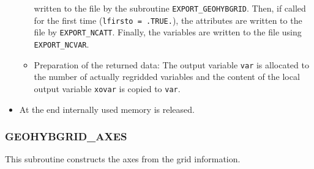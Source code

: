 \documentclass[11pt,twoside]{article}
\begin{document}
\begin{itemize}
\begin{itemize}
written to the file by the
subroutine \verb|EXPORT_GEOHYBGRID|. Then, if called for the first
time (\verb|lfirsto = .TRUE.|), the attributes are written to the
file by \verb|EXPORT_NCATT|. Finally, the variables are written to the file
using \verb|EXPORT_NCVAR|. 
\item Preparation of the returned data: The output variable \verb|var|
is allocated to the number of actually regridded variables and the
content of the local output variable \verb|xovar| is copied to \verb|var|.
\end{itemize} %
\item  At the end internally used memory is released.
\end{itemize}  %


\subsubsection{GEOHYBGRID\_AXES\label{GRIDAXES}}
This subroutine constructs the axes from the grid information.
\end{document}
